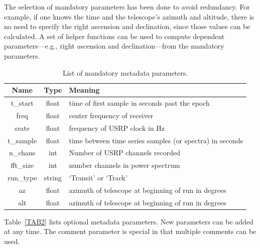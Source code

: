 \documentclass[12pt]{article}
\begin{document}
 The selection of mandatory parameters has been done to avoid redundancy.   For example, if one knows the time and the telescope's azimuth and altitude, there is no need to specify the right 
ascension and declination, since those values can be calculated.    A set of helper functions 
can be used to compute dependent parameters---e.g., right ascension and declination---from the mandatory parameters.   
 
 \begin{table}[htbp] 
 \caption{List of mandatory metadata parameters.}
 \label{TAB1}
 \begin{center}
 \begin{tabular}{| c | c|  l |}
 \hline 
 Name & Type & Meaning \\
 \hline  \hline
t\_start        & float   & time of first sample in seconds past the epoch \\
freq      & float   & center frequency of receiver \\
srate       & float   & frequency of USRP clock in Hz \\
t\_sample     & float   & time between time series samples (or spectra) in seconds \\
n\_chans       & int  & Number of USRP channels recorded \\
fft\_size       & int     &  number channels in power spectrum \\
run\_type     & string & `Transit' or `Track' \\
az                & float  & azimuth of telescope at beginning of run in degrees \\
alt                & float  & azimuth of telescope at beginning of run in degrees \\
\hline
\end{tabular}
\end{center}
\end{table}
 
 Table~\ref{TAB2} lists optional metadata parameters.    New parameters can be added at any time.   The comment parameter is special in that multiple comments can be used.   
 
\end{document}
